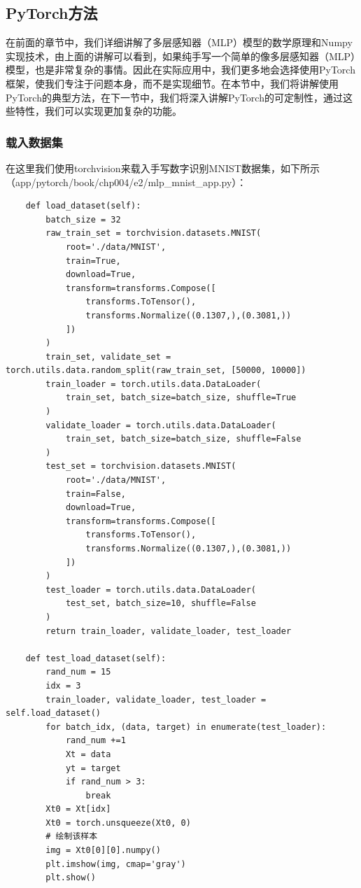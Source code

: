 \documentclass[UTF8]{article}
\begin{document}
\subsection{PyTorch方法}
在前面的章节中，我们详细讲解了多层感知器（MLP）模型的数学原理和Numpy实现技术，由上面的讲解可以看到，如果纯手写一个简单的像多层感知器（MLP）模型，也是非常复杂的事情。因此在实际应用中，我们更多地会选择使用PyTorch框架，使我们专注于问题本身，而不是实现细节。在本节中，我们将讲解使用PyTorch的典型方法，在下一节中，我们将深入讲解PyTorch的可定制性，通过这些特性，我们可以实现更加复杂的功能。\newline
\subsubsection{载入数据集}
在这里我们使用torchvision来载入手写数字识别MNIST数据集，如下所示（app/pytorch/book/chp004/e2/mlp\_mnist\_app.py）：
\begin{lstlisting}
    def load_dataset(self):
        batch_size = 32
        raw_train_set = torchvision.datasets.MNIST(
            root='./data/MNIST',
            train=True,
            download=True,
            transform=transforms.Compose([
                transforms.ToTensor(),
                transforms.Normalize((0.1307,),(0.3081,))
            ])
        )
        train_set, validate_set = torch.utils.data.random_split(raw_train_set, [50000, 10000])
        train_loader = torch.utils.data.DataLoader(
            train_set, batch_size=batch_size, shuffle=True
        )
        validate_loader = torch.utils.data.DataLoader(
            train_set, batch_size=batch_size, shuffle=False
        )
        test_set = torchvision.datasets.MNIST(
            root='./data/MNIST',
            train=False,
            download=True,
            transform=transforms.Compose([
                transforms.ToTensor(),
                transforms.Normalize((0.1307,),(0.3081,))
            ])
        )
        test_loader = torch.utils.data.DataLoader(
            test_set, batch_size=10, shuffle=False
        )
        return train_loader, validate_loader, test_loader

    def test_load_dataset(self):
        rand_num = 15
        idx = 3
        train_loader, validate_loader, test_loader = self.load_dataset()
        for batch_idx, (data, target) in enumerate(test_loader):
            rand_num +=1
            Xt = data
            yt = target
            if rand_num > 3:
                break
        Xt0 = Xt[idx]
        Xt0 = torch.unsqueeze(Xt0, 0)
        # 绘制该样本
        img = Xt0[0][0].numpy()
        plt.imshow(img, cmap='gray')
        plt.show()
\end{lstlisting}
\end{document}
